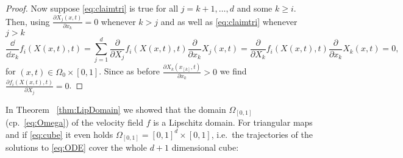 \begin{proof}
    Now suppose \eqref{eq:claimtri} is true for all $j=k+1,\dots,d$
    and some $k\ge i$. Then, using
    $\frac{\partial X_j(x,t)}{\partial x_k}=0$ whenever $k>j$ and as
    well as \eqref{eq:claimtri} whenever $j>k$
    \begin{equation*}
      \frac{\dd}{\dd x_k}f_i(X(x,t), t) =
      \sum_{j=1}^d\frac{\partial}{\partial X_{j}}f_i(X(x,t),
      t)\frac{\partial }{\partial x_{k}}X_{j}(x,t)
      =\frac{\partial}{\partial X_{k}}f_i(X(x,t),
      t)\frac{\partial }{\partial x_{k}}X_{k}(x,t)=0,
    \end{equation*}
    for $(x,t)\in\Omega_0\times [0,1]$. Since as before
    $\frac{\partial X_{k}(x_{[k]},t)}{\partial x_{k}} > 0$ we find
    $\frac{\partial f_i(X(x,t), t)}{\partial X_{j}} = 0$.
  \end{proof}

  In Theorem ~\ref{thm:LipDomain} we showed that the domain
  $\Omega_{[0,1]}$ (cp.~\eqref{eq:Omega}) of the velocity field $f$ is
  a Lipschitz domain. For triangular maps and if \eqref{eq:cube} it
  even holds $\Omega_{[0,1]}=[0,1]^d\times [0,1]$, i.e.\ the
  trajectories of the solutions to \eqref{eq:ODE} cover the whole
  $d+1$ dimensional cube:

